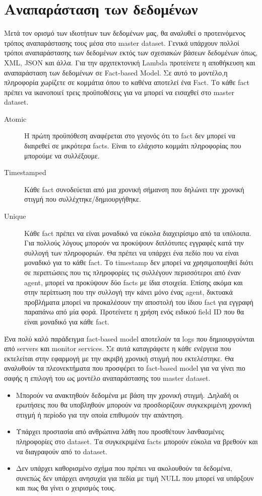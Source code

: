 \section{Αναπαράσταση των δεδομένων}
Μετά τον ορισμό των ιδιοτήτων των δεδομένων μας, θα αναλυθεί ο προτεινόμενος τρόπος αναπαράστασης τους μέσα στο master dataset. Γενικά υπάρχουν πολλοί τρόποι αναπαράστασης των δεδομένων εκτός των σχεσιακών βάσεων δεδομένων όπως, XML, JSON και άλλα.
\newline
Για την αρχιτεκτονική Lambda προτείνετε η αποθήκευση και αναπαράσταση των δεδομένων σε Fact-based Model. Σε αυτό το μοντέλο,η πληροφορία χωρίζετε σε κομμάτια όπου το καθένα αποτελεί ένα Fact. Το κάθε fact πρέπει να ικανοποιεί τρεις προϋποθέσεις για να μπορεί να εισαχθεί στο master dataset.

\begin{description}
\item [Atomic] Η πρώτη προϋπόθεση αναφέρεται στο γεγονός ότι το fact δεν μπορεί να διαιρεθεί σε μικρότερα  facts. Είναι το ελάχιστο κομμάτι πληροφορίας που μπορούμε να συλλέξουμε.
\item [Timestamped] Κάθε fact συνοδεύεται από μια χρονική σήμανση που δηλώνει την χρονική στιγμή που συλλέχτηκε/δημιουργήθηκε.
\item [Unique] Κάθε fact πρέπει να είναι μοναδικό να εύκολα διαχειρίσιμο από τα υπόλοιπα. Για πολλούς λόγους μπορούν να προκύψουν διπλότυπες εγγραφές κατά την συλλογή των πληροφοριών. Θα πρέπει να υπάρχει ένα πεδίο που να είναι μοναδικό για το κάθε fact. Το timestamp δεν μπορεί να χρησιμοποιηθεί διότι σε περιπτώσεις που τις πληροφορίες τις συλλέγουν περισσότεροι από έναν agent, μπορεί να προκύψουν δύο facts με ίδια στοιχεία. Επίσης ακόμα και στην περίπτωση που την συλλογή την κάνει μόνο ένας agent, δικτυακά προβλήματα μπορεί να προκαλέσουν την αποστολή του ίδιου fact για εγγραφή παραπάνω από μία φορά. Προτείνετε η χρήση ενός ειδικού field ID που θα είναι μοναδικό για κάθε fact.
\end{description}
Ένα πολύ καλό παράδειγμα fact-based model αποτελούν τα logs που δημιουργούνται από servers και monitor services. Σε αυτά καταγράφετε η κάθε ενέργεια που εκτελείται στην εφαρμογή με την ακριβή χρονική στιγμή που εκτελέστηκε.
\newline
Θα αναλυθούν τα πλεονεκτήματα που προσφέρει το fact-based model για να γίνει πιο σαφής η επιλογή του ως μοντέλο αναπαράστασης του master dataset.
\begin{itemize}
\item Μπορούν να ανακτηθούν δεδομένα με βάση την χρονική στιγμή. Δηλαδή οι ερωτήσεις που θα υποβληθούν μπορούν να προσδιορίζουν συγκεκριμένη χρονική στιγμή ή περίοδο για την οποία επιθυμούν την απάντηση.
\item Υπάρχει προστασία από ανθρώπινα λάθη που προσθέτουν λανθασμένες πληροφορίες στο dataset. Τα συγκεκριμένα facts μπορούν εύκολα να βρεθούν και να διαγραφούν από το dataset.
\item Δεν υπάρχει καθορισμένο σχήμα που πρέπει να ακολουθούν τα δεδομένα, συνεπώς δεν υπάρχει ανησυχία για πεδία με τιμή NULL που μπορεί να υπάρξουν και πως θα γίνει ο χειρισμός τους.
\end{itemize}

